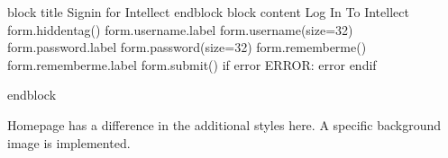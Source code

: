 \documentclass[letterpaper,10pt,english]{sphinxmanual}
\begin{document}
\begin{sphinxVerbatim}[commandchars=\\\{\}]
\PYGZob{}\PYGZpc{} block title \PYGZpc{}\PYGZcb{} Sign\PYGZhy{}in for Intellect \PYGZob{}\PYGZpc{} endblock \PYGZpc{}\PYGZcb{}
\PYGZob{}\PYGZpc{} block content \PYGZpc{}\PYGZcb{}
    Log In To Intellect
       
        \PYGZob{}\PYGZob{} form.hidden\PYGZus{}tag() \PYGZcb{}\PYGZcb{}
            \PYGZob{}\PYGZob{} form.username.label \PYGZcb{}\PYGZcb{}
            \PYGZob{}\PYGZob{} form.username(size=32) \PYGZcb{}\PYGZcb{}
            \PYGZob{}\PYGZob{} form.password.label \PYGZcb{}\PYGZcb{}
            \PYGZob{}\PYGZob{} form.password(size=32) \PYGZcb{}\PYGZcb{}
        \PYGZob{}\PYGZob{} form.remember\PYGZus{}me() \PYGZcb{}\PYGZcb{} \PYGZob{}\PYGZob{} form.remember\PYGZus{}me.label \PYGZcb{}\PYGZcb{}
        \PYGZob{}\PYGZob{} form.submit() \PYGZcb{}\PYGZcb{}
    \PYGZob{}\PYGZpc{} if error \PYGZpc{}\PYGZcb{}
         ERROR: \PYGZob{}\PYGZob{} error \PYGZcb{}\PYGZcb{}
    \PYGZob{}\PYGZpc{} endif \PYGZpc{}\PYGZcb{}

\PYGZob{}\PYGZpc{} endblock \PYGZpc{}\PYGZcb{}
\end{sphinxVerbatim}

 
Homepage has a difference in the additional styles here. A specific background image is implemented.
\end{document}
